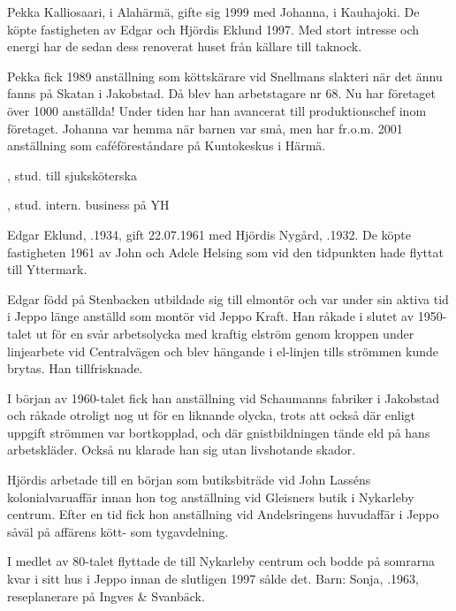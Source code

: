 Pekka Kalliosaari,  i Alahärmä, gifte sig 1999 med Johanna,  i Kauhajoki. De köpte fastigheten av Edgar och Hjördis Eklund 1997. Med stort intresse och energi har de sedan dess renoverat huset från källare till taknock.




Pekka fick 1989 anställning som köttskärare vid Snellmans slakteri när det ännu fanns på Skatan i Jakobstad. Då blev han arbetstagare nr 68. Nu har företaget över 1000 anställda! Under tiden har han avancerat till produktionschef inom företaget. Johanna var hemma när barnen var små, men har fr.o.m. 2001	anställning som caféföreståndare på Kuntokeskus i Härmä.
\begin{jhchildren}
  \item {}, stud. till sjuksköterska
  \item {}, stud. intern. business på YH
  \item {}
\end{jhchildren}


Edgar Eklund, .1934, gift 22.07.1961 med Hjördis Nygård, .1932. De köpte fastigheten 1961 av John och Adele Helsing som vid den tidpunkten hade flyttat till Yttermark.

Edgar född på Stenbacken utbildade sig till elmontör och var under sin aktiva tid i Jeppo länge anställd som montör vid Jeppo	Kraft. Han 	råkade i slutet av 1950-talet ut för en svår arbetsolycka med kraftig elström genom kroppen under linjearbete vid Centralvägen och blev 	hängande i el-linjen tills strömmen kunde brytas. Han tillfrisknade.

I början av 1960-talet fick han anställning vid Schaumanns fabriker i Jakobstad och råkade otroligt nog ut för en liknande olycka, trots att också där enligt uppgift strömmen var bortkopplad, och där gnistbildningen tände eld på hans arbetskläder. Också nu klarade han sig utan livshotande skador.

Hjördis arbetade till en början som butiksbiträde vid John Lasséns kolonialvaruaffär innan hon tog anställning vid Gleisners butik i Nykarleby centrum. Efter en tid fick hon anställning vid Andelsringens huvudaffär i Jeppo såväl på affärens kött- som tygavdelning.

I medlet av 80-talet flyttade de till Nykarleby centrum och bodde på 	somrarna kvar i sitt hus i Jeppo innan de slutligen 1997 sålde det.
Barn:  Sonja, .1963, reseplanerare på Ingves \& Svanbäck.


